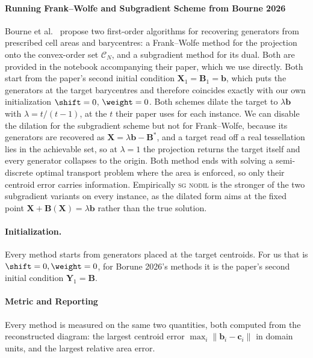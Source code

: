 \paragraph*{Running Frank--Wolfe and Subgradient Scheme from Bourne 2026}
Bourne et al.~\cite{Bourne2026} propose two first-order algorithms for recovering generators from prescribed cell areas and barycentres: a Frank--Wolfe method for the projection onto the convex-order set $\mathcal{C}_N$, and a subgradient method for its dual. Both are provided in the notebook accompanying their paper, which we use directly. 
Both start from the paper's second
initial condition $\mathbf{X}_1 = \mathbf{B}_1 = \mathbf{b}$, which puts the generators at the target barycentres and therefore coincides exactly
with our own initialization $\shift = 0$, $\weight = 0$. Both schemes dilate the target to $\lambda\mathbf{b}$ with $\lambda = t/(t-1)$, at the $t$ their paper uses for each instance. We can disable the dilation for the
subgradient scheme but not for Frank--Wolfe, because its generators are recovered as $\mathbf{X} = \lambda\mathbf{b} - \mathbf{B}^\ast$, and a
target read off a real tessellation lies in the achievable set, so at $\lambda = 1$ the projection returns the target itself and every generator collapses to the origin. 
Both method ends with solving a semi-discrete optimal transport problem where the area is enforced, so only their centroid error carries information. 
Empirically \textsc{sg nodil} is the stronger of the two subgradient
variants on every instance, as the dilated form aims
at the fixed point $\mathbf{X} + \mathbf{B}(\mathbf{X}) = \lambda\mathbf{b}$
rather than the true solution.


\paragraph*{Initialization.}
Every method starts from generators placed at the target centroids. For us that
is $\shift=0,\weight=0$, for Borune 2026's methods it is the paper's second
initial condition $\mathbf{Y}_1=\mathbf{B}$. 

\paragraph*{Metric and Reporting}
Every method is measured on the same two quantities, both computed from the
reconstructed diagram: the largest centroid error
$\max_i\|\mathbf{b}_i-\mathbf{c}_i\|$ in domain units, and the largest
relative area error.

